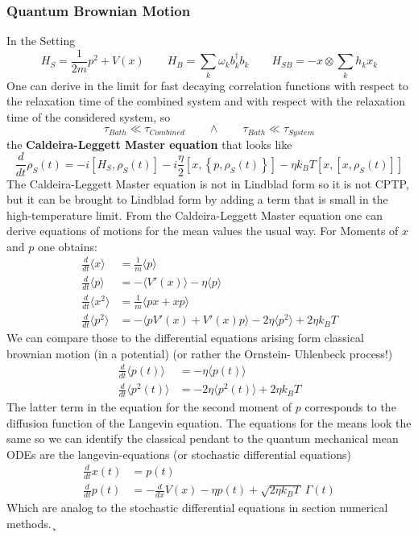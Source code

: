 	\subsubsection{Quantum Brownian Motion}
	In the Setting
	\begin{equation}
		H_S = \frac{1}{2m} p^2 + V(x) \qquad H_B =	\sum_k \omega_k b_k^\dagger b_k \qquad H_{SB} =	- x \otimes \sum_k h_k x_k
	\end{equation}
	One can derive in the limit for fast decaying correlation functions with respect to the relaxation time of the combined system and with respect with the relaxation time of the considered system, so
	\begin{equation}
		\tau_{Bath} \ll \tau_{Combined} \qquad \wedge \qquad \tau_{Bath} \ll \tau_{System}
	\end{equation}
	the \textbf{Caldeira-Leggett Master equation} that looks like \cite{breuer2002theory}
	\begin{equation}
		\frac{d}{dt} \rho_S(t) =	- i \left[H_S, \rho_{S}(t)\right] - i \frac{\eta}{2} \left[x, \left\{ p, \rho_S(t) \right\}\right] - { \eta k_B T} \left[x, \left[x, \rho_S(t)\right]\right]
	\end{equation}
	The Caldeira-Leggett Master equation is not in Lindblad form so it is not CPTP, but it can be brought to Lindblad form by adding a term that is small in the high-temperature limit.
	From the Caldeira-Leggett Master equation one can derive equations of motions for the mean values the usual way. For Moments of $x$ and $p$ one obtains:
	\begin{align}
		\frac{d}{dt}\langle x \rangle &= \frac{1}{m} \langle p \rangle \\
		\frac{d}{dt}\langle p \rangle &=	- \langle V'(x)\rangle -  \eta \langle p \rangle \\
		\frac{d}{dt} \langle x^2 \rangle &= \frac{1}{m} \langle px + xp \rangle \\
		\frac{d}{dt} \langle p^2 \rangle &=	- \langle p V'(x) + V'(x)p \rangle - 2 \eta \langle p^2 \rangle + 2 \eta k_B	T
	\end{align}
	We can compare those to the differential equations arising form classical brownian motion (in a potential) (or rather the Ornstein- Uhlenbeck process!)
	\begin{align}
		\frac{d}{dt} \langle p(t) \rangle &=	- \eta \langle p(t) \rangle \\
		\frac{d}{dt} \langle p^2(t) \rangle &= - 2 \eta \langle p^2(t) \rangle + 2 \eta k_B T
	\end{align}
	The latter term in the equation for the second moment of $p$ corresponds to the diffusion function of the Langevin equation. The equations for the means look the same so we can identify the classical pendant to the quantum mechanical mean ODEs are the langevin-equations (or stochastic differential equations)
	\begin{align}
		\frac{d}{dt} x(t) &=	p(t) \\
		\frac{d}{dt} p(t) &= - \frac{d}{dx} V(x) - \eta p(t) + \sqrt{2 \eta k_B T} ~ \Gamma (t)
	\end{align}
	Which are analog to the stochastic differential equations in section numerical methods.¸
